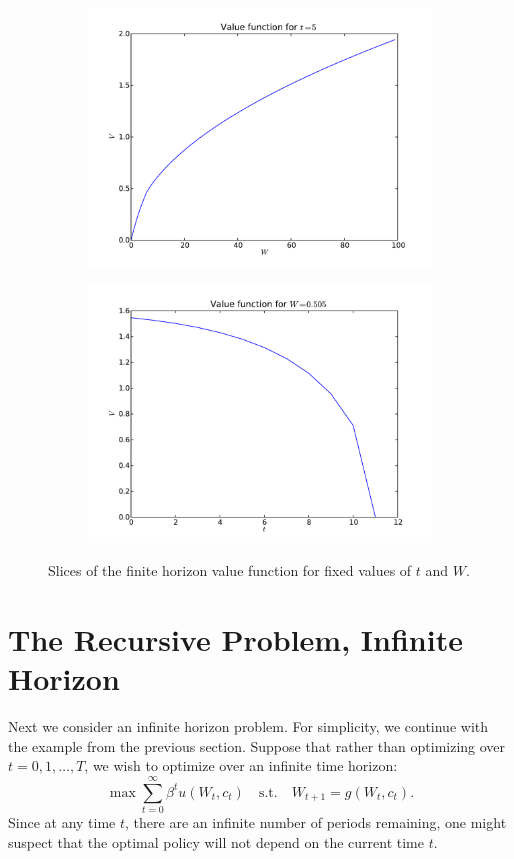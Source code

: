 \begin{figure}
\begin{subfigure}{.5\textwidth}
    \includegraphics[width=\textwidth]{fixed_time.pdf}
\end{subfigure}
\begin{subfigure}{.5\textwidth}
    \includegraphics[width=\textwidth]{fixed_w.pdf}
\end{subfigure}
\caption{Slices of the finite horizon value function for fixed values of $t$ and $W$.}
\end{figure}

\section*{The Recursive Problem, Infinite Horizon}\label{SecRecProbInFHor}
Next we consider an infinite horizon problem.  For simplicity, we continue with the example from the previous section.  Suppose that rather than optimizing over $t = 0,1,\ldots,T$, we wish to optimize over an infinite time horizon:
\begin{equation*}
\max \sum_{t=0}^\infty \beta^t u(W_t,c_t) \quad \text{s.t.} \quad W_{t+1} = g(W_t,c_t).
\end{equation*}
Since at any time $t$, there are an infinite number of periods remaining, one might suspect that the optimal policy will not depend on the current time $t$.

